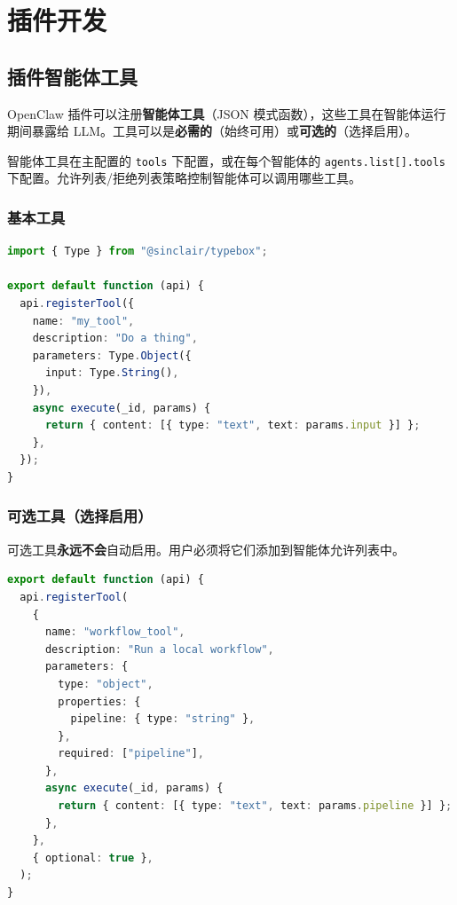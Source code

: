 \chapter{插件开发}

\section{插件智能体工具}


OpenClaw 插件可以注册\textbf{智能体工具}（JSON 模式函数），这些工具在智能体运行期间暴露给 LLM。工具可以是\textbf{必需的}（始终可用）或\textbf{可选的}（选择启用）。

智能体工具在主配置的 \texttt{tools} 下配置，或在每个智能体的 \texttt{agents.list[].tools} 下配置。允许列表/拒绝列表策略控制智能体可以调用哪些工具。

\subsection{基本工具}


\begin{lstlisting}[language=typescript]
import { Type } from "@sinclair/typebox";

export default function (api) {
  api.registerTool({
    name: "my_tool",
    description: "Do a thing",
    parameters: Type.Object({
      input: Type.String(),
    }),
    async execute(_id, params) {
      return { content: [{ type: "text", text: params.input }] };
    },
  });
}
\end{lstlisting}


\subsection{可选工具（选择启用）}


可选工具\textbf{永远不会}自动启用。用户必须将它们添加到智能体允许列表中。

\begin{lstlisting}[language=typescript]
export default function (api) {
  api.registerTool(
    {
      name: "workflow_tool",
      description: "Run a local workflow",
      parameters: {
        type: "object",
        properties: {
          pipeline: { type: "string" },
        },
        required: ["pipeline"],
      },
      async execute(_id, params) {
        return { content: [{ type: "text", text: params.pipeline }] };
      },
    },
    { optional: true },
  );
}
\end{lstlisting}


